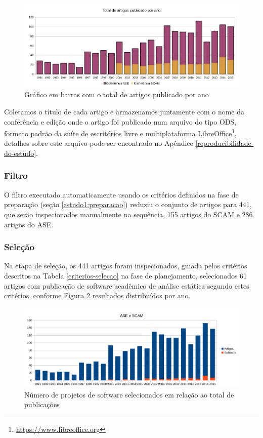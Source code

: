 \begin{figure}[h]
  \center
  \includegraphics[scale=0.65]{imagens/artigos-por-ano.png}
  \caption{Gráfico em barras com o total de artigos publicado por ano}
  \label{artigos-por-ano}
\end{figure}

Coletamos o título de cada artigo e armazenamos juntamente com o nome da
conferência e edição onde o artigo foi publicado num arquivo do tipo ODS,
formato padrão da suíte de escritórios livre e multiplataforma
LibreOffice\footnote{\url{https://www.libreoffice.org}}, detalhes sobre este
arquivo pode ser encontrado no Apêndice \ref{reproducibilidade-do-estudo}.

\subsubsection{Filtro}


O filtro executado automaticamente usando os critérios definidos na fase de
preparação (seção \ref{estudo1:preparacao}) reduziu o conjunto de artigos para
441, que serão inspecionados manualmente na sequência,
155 artigos do SCAM e 286 artigos do ASE.

\subsubsection{Seleção}

Na etapa de seleção, os 441 artigos foram inspecionados, guiada pelos critérios
descritos na Tabela \ref{criterios-selecao} na fase de planejamento,
selecionados 61 artigos com publicação de software acadêmico de análise estática
segundo estes critérios, conforme Figura \ref{artigos-e-software-por-ano}
resultados distribuídos por ano.

\begin{figure}[h]
  \center
  \includegraphics[scale=0.65]{imagens/artigos-e-software-por-ano.png}
  \caption{Número de projetos de software selecionados em relação ao total de publicações}
  \label{artigos-e-software-por-ano}
\end{figure}

